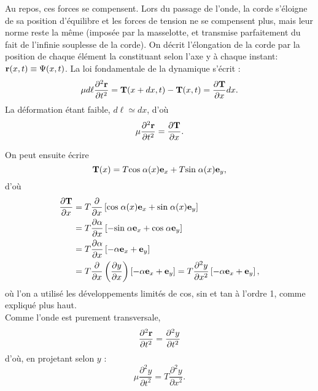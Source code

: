\documentclass[11pt,a4paper]{report}
\begin{document}
Au repos, ces forces se compensent. Lors du passage de l'onde, la corde s'éloigne de sa position d'équilibre et les forces de tension ne se compensent plus, mais leur norme reste la même (imposée par la masselotte, et transmise parfaitement du fait de l'infinie souplesse de la corde). On décrit l'élongation de la corde par la position de chaque élément la constituant selon l'axe y à chaque instant: $\bold{r}(x,t) \equiv \Psi(x,t)$. La loi fondamentale de la dynamique s'écrit :
\begin{equation*}
	\mu d\ell \frac{\partial^2 \bold{r}}{\partial t^2} = \bold{T}(x+dx,t) - \bold{T}(x,t) = \frac{\partial \bold{T}}{\partial x} dx.
\end{equation*}
La déformation étant faible, $d\ell \simeq dx$, d'où
\begin{equation}
	\mu \frac{\partial^2 \bold{r}}{\partial t^2} = \frac{\partial \bold{T}}{\partial x}.
\end{equation}

On peut ensuite écrire 
\begin{equation}
	\bold{T}(x) = T \text{cos}\;\alpha(x)\bold{e}_x  + T \text{sin}\;\alpha(x)\bold{e}_y,
\end{equation}
d'où 
\begin{align*}
	\frac{\partial \bold{T}}{\partial x} & = T \frac{\partial}{\partial x}\left[\text{cos}\;\alpha(x)\bold{e}_x + \text{sin}\;\alpha(x)\bold{e}_y \right]\\
	& = T \frac{\partial \alpha}{\partial x}\left[-\text{sin}\;\alpha \bold{e}_x  +  \text{cos}\;\alpha \bold{e}_y\right]\\
	& = T \frac{\partial \alpha}{\partial x}\left[-\alpha \bold{e}_x  + \bold{e}_y\right]\\
	& = T \frac{\partial}{\partial x}\left(\frac{\partial y}{\partial x}\right)\left[-\alpha \bold{e}_x  + \bold{e}_y\right] 
	= T\frac{\partial^2 y}{\partial x^2}\left[-\alpha \bold{e}_x  + \bold{e}_y\right],
\end{align*}
où l'on a utilisé les développements limités de cos, sin et tan à l'ordre 1, comme expliqué plus haut.\\

Comme l'onde est purement transversale,
\begin{equation}
	\frac{\partial^2 \bold{r}}{\partial t^2} = \frac{\partial^2 y}{\partial t^2}
\end{equation}
d'où, en projetant selon $y$ :
\begin{equation*}
	\mu \frac{\partial^2 y}{\partial t^2} =  T\frac{\partial^2 y}{\partial x^2}.
\end{equation*}
\end{document}
